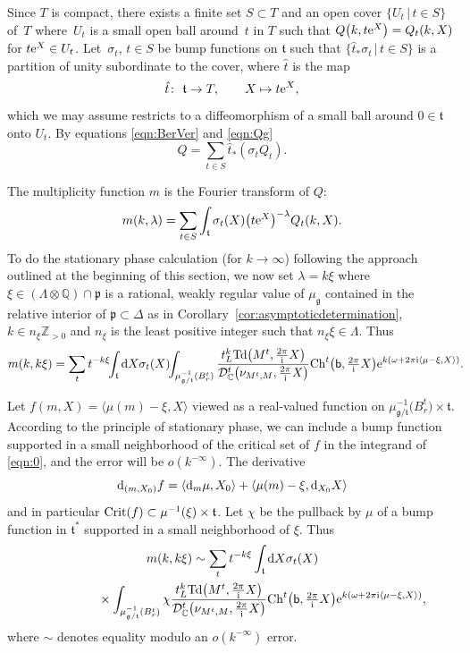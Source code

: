 \documentclass[11pt]{article}
\numberwithin{equation}{section}
\newcommand{\pair}[2]{\langle #1, #2 \rangle}
\newcommand{\tn}[1]{\textnormal{#1}}
\renewcommand{\i}{{\mathrm{i}}}
\def\g{\ensuremath{\mathfrak{g}}}
\def\t{\ensuremath{\mathfrak{t}}}
\def\p{\ensuremath{\mathfrak{p}}}
\def\bC{\ensuremath{\mathbb{C}}}
\def\bZ{\ensuremath{\mathbb{Z}}}
\def\bQ{\ensuremath{\mathbb{Q}}}
\def\Ch{\ensuremath{\textnormal{Ch}}}
\def\Td{\ensuremath{\textnormal{Td}}}
\def\calDC{\ensuremath{\mathcal{D}_{\bC}}}
\begin{document}
Since $T$ is compact, there exists a finite set $S \subset T$ and an open cover $\{U_t\,|\,t \in S\}$ of~$T$ where~$U_t$ is a small open ball around~$t$ in $T$ such that $Q\big(k,t{\rm e}^X\big)=Q_t(k,X)$ for $t{\rm e}^X \in U_t$. Let~$\sigma_t$, $t \in S$ be bump functions on $\t$ such that $\{\hat{t}_\ast \sigma_t\,|\,t \in S\}$ is a partition of unity subordinate to the cover, where $\hat{t}$ is the map
\[ \hat{t}\colon \ \t \rightarrow T, \qquad X \mapsto t{\rm e}^X,\]
which we may assume restricts to a diffeomorphism of a small ball around $0 \in \t$ onto $U_t$. By equations \eqref{eqn:BerVer} and \eqref{eqn:Qg}
\[ Q=\sum_{t \in S} \hat{t}_\ast (\sigma_t Q_t). \]

The multiplicity function $m$ is the Fourier transform of $Q$:
\[ m(k,\lambda)=\sum_{t\in S} \int_{\t} \sigma_t(X)\big(t{\rm e}^X\big)^{-\lambda}Q_t(k,X).\]
To do the stationary phase calculation (for $k \rightarrow \infty$) following the approach outlined at the beginning of this section, we now set $\lambda=k\xi$ where $\xi \in (\Lambda \otimes \bQ)\cap \p$ is a rational, weakly regular value of $\mu_\g$ contained in the relative interior of $\p \subset \Delta$ as in Corollary~\ref{cor:asymptoticdetermination}, $k \in n_\xi\bZ_{>0}$ and $n_\xi$ is the least positive integer such that $n_\xi\xi \in \Lambda$. Thus
\begin{gather}\label{eqn:0}
m(k,k\xi)=\sum_t t^{-k\xi}\!\!\int_\t {\rm d} X \sigma_t(X)\!\! \int_{\mu_{\g/\t}^{-1}(B_r^t)} \frac{t_L^k\Td\big(M^t,\tfrac{2\pi}{\i}X\big)}{\calDC^t\big(\nu_{M^t,M},\tfrac{2\pi}{\i}X\big)}\Ch^t\big({\sf b},\tfrac{2\pi}{\i}X\big){\rm e}^{k(\omega+2\pi \i\pair{\mu-\xi}{X})}.\!\!\!\!
\end{gather}

Let $f(m,X)=\pair{\mu(m)-\xi}{X}$ viewed as a real-valued function on $\mu_{\g/\t}^{-1}\big(B_r^t\big) \times \t$. According to the principle of stationary phase, we can include a bump function supported in a small neighborhood of the critical set of $f$ in the integrand of \eqref{eqn:0}, and the error will be $o(k^{-\infty})$. The derivative
\[ {\rm d}_{(m,X_0)}f=\pair{{\rm d}_m\mu}{X_0}+\pair{\mu(m)-\xi}{{\rm d}_{X_0}X}\]
and in particular $\tn{Crit}(f)\subset \mu^{-1}(\xi)\times \t$. Let $\chi$ be the pullback by $\mu$ of a bump function in $\t^\ast$ supported in a small neighborhood of $\xi$. Thus{\samepage
\begin{gather}
m(k,k\xi)\sim \sum_t t^{-k\xi} \int_\t {\rm d}X \sigma_t(X)\nonumber\\
\hphantom{m(k,k\xi)\sim}{}\times \int_{\mu_{\g/\t}^{-1}(B_r^t)}\chi \frac{t_L^k \Td\big(M^t,\tfrac{2\pi}{\i}X\big)}{\calDC^t\big(\nu_{M^t,M},\tfrac{2\pi}{\i}X\big)}\Ch^t\big({\sf b},\tfrac{2\pi}{\i}X\big){\rm e}^{k(\omega+2\pi \i\pair{\mu-\xi}{X})},\label{eqn:1}
\end{gather}
where $\sim$ denotes equality modulo an $o(k^{-\infty})$ error.}
\end{document}

